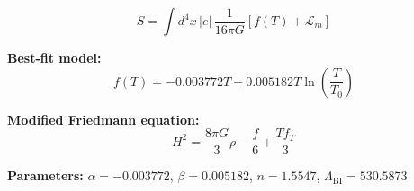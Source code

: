 
\begin{equation}
  S = \int d^4x \, |e| \, \frac{1}{16\pi G} \left[ f(T) + \mathcal{L}_m \right]
\end{equation}

\textbf{Best-fit model:}
\begin{equation}
  f(T) = -0.003772 T + 0.005182 T \ln\!\left(\frac{T}{T_0}\right)
\end{equation}

\textbf{Modified Friedmann equation:}
\begin{equation}
  H^2 = \frac{8\pi G}{3} \rho - \frac{f}{6} + \frac{T f_T}{3}
\end{equation}

\textbf{Parameters:}
$\alpha = -0.003772$, \quad
$\beta = 0.005182$, \quad
$n = 1.5547$, \quad
$\Lambda_{\text{BI}} = 530.5873$